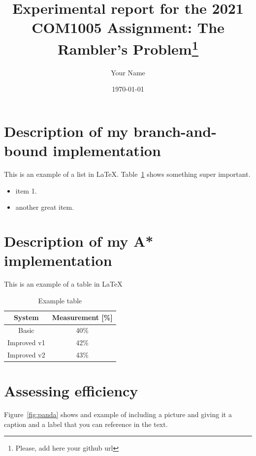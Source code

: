 \documentclass[11pt,oneside]{article}
\title{Experimental report for the 2021 COM1005 Assignment: The Rambler's Problem\footnote{Please, add here your github url}}
\author{Your Name}
\date{\today}
\begin{document}
\maketitle

\section{Description of my branch-and-bound implementation}

This is an example of a list in \LaTeX. Table~\ref{tab:my_label} shows something super important.

\begin{itemize}
    \item item 1.
    \item another great item.
\end{itemize}

\section{Description of my A* implementation}

This is an example of a table in \LaTeX

\begin{table}[ht]
    \centering
    \begin{tabular}{|c|c|}
        System      & Measurement [\%] \\ \hline
        Basic       & 40\% \\
        Improved v1 & 42\% \\
        Improved v2 & 43\% \\
    \end{tabular}
    \caption{Example table}
    \label{tab:my_label}
\end{table}

\section{Assessing efficiency}

Figure~\ref{fig:panda} shows and example of including a picture and giving it a caption and a label that you can reference in the text.
\end{document}
